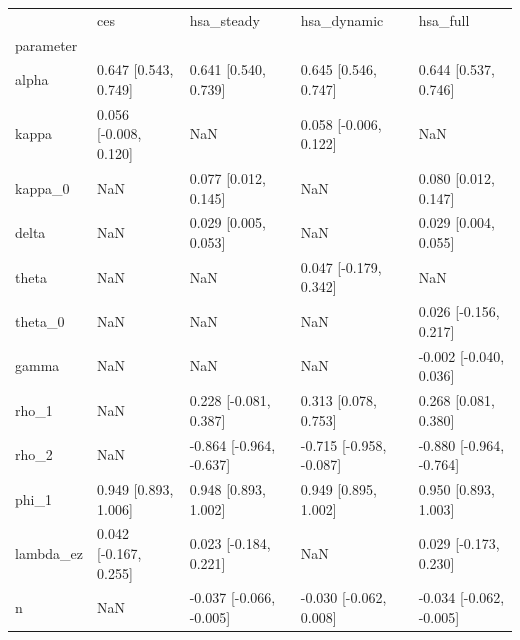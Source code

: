 \begin{tabular}{lllll}
\toprule
 & ces & hsa\_steady & hsa\_dynamic & hsa\_full \\
parameter &  &  &  &  \\
\midrule
alpha & 0.647 [0.543, 0.749] & 0.641 [0.540, 0.739] & 0.645 [0.546, 0.747] & 0.644 [0.537, 0.746] \\
kappa & 0.056 [-0.008, 0.120] & NaN & 0.058 [-0.006, 0.122] & NaN \\
kappa\_0 & NaN & 0.077 [0.012, 0.145] & NaN & 0.080 [0.012, 0.147] \\
delta & NaN & 0.029 [0.005, 0.053] & NaN & 0.029 [0.004, 0.055] \\
theta & NaN & NaN & 0.047 [-0.179, 0.342] & NaN \\
theta\_0 & NaN & NaN & NaN & 0.026 [-0.156, 0.217] \\
gamma & NaN & NaN & NaN & -0.002 [-0.040, 0.036] \\
rho\_1 & NaN & 0.228 [-0.081, 0.387] & 0.313 [0.078, 0.753] & 0.268 [0.081, 0.380] \\
rho\_2 & NaN & -0.864 [-0.964, -0.637] & -0.715 [-0.958, -0.087] & -0.880 [-0.964, -0.764] \\
phi\_1 & 0.949 [0.893, 1.006] & 0.948 [0.893, 1.002] & 0.949 [0.895, 1.002] & 0.950 [0.893, 1.003] \\
lambda\_ez & 0.042 [-0.167, 0.255] & 0.023 [-0.184, 0.221] & NaN & 0.029 [-0.173, 0.230] \\
n & NaN & -0.037 [-0.066, -0.005] & -0.030 [-0.062, 0.008] & -0.034 [-0.062, -0.005] \\
\bottomrule
\end{tabular}

